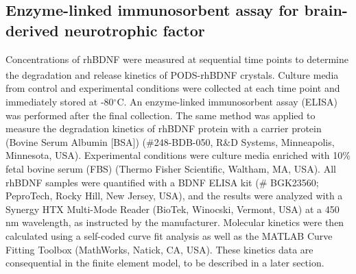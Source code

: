 \documentclass[review]{elsarticle}
\begin{document}
\subsection{Enzyme-linked immunosorbent assay for brain-derived neurotrophic factor}
Concentrations of rhBDNF were measured at sequential time points to determine the degradation and release kinetics of PODS\textsuperscript{\textregistered}-rhBDNF crystals. Culture media from control and experimental conditions were collected at each time point and immediately stored at -80$^\circ$C. An enzyme-linked immunosorbent assay (ELISA) was performed after the final collection. The same method was applied to measure the degradation kinetics of rhBDNF protein with a carrier protein (Bovine Serum Albumin [BSA]) (\#248-BDB-050, R\&D Systems, Minneapolis, Minnesota, USA). Experimental conditions were culture media enriched with 10\% fetal bovine serum (FBS) (Thermo Fisher Scientific, Waltham, MA, USA). All rhBDNF samples were quantified with a BDNF ELISA kit (\# BGK23560; PeproTech, Rocky Hill, New Jersey, USA), and the results were analyzed with a Synergy HTX Multi-Mode Reader (BioTek, Winocski, Vermont, USA) at a 450 nm wavelength, as instructed by the manufacturer. Molecular kinetics were then calculated using a self-coded curve fit analysis as well as the MATLAB Curve Fitting Toolbox (MathWorks, Natick, CA, USA). These kinetics data are consequential in the finite element model, to be described in a later section.
\end{document}
